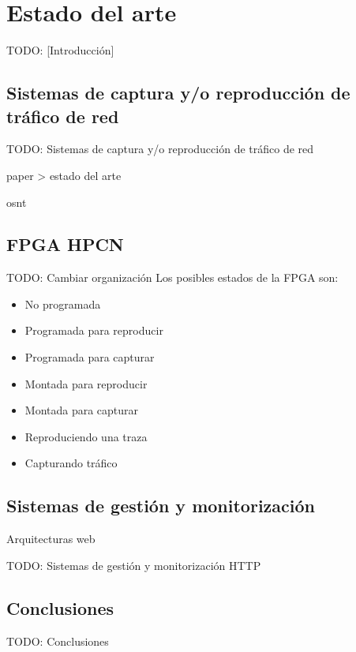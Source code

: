 \chapter{Estado del arte\label{cap:estadoDelArte}}

TODO: [Introducción]


\section{Sistemas de captura y/o reproducción de tráfico de red\label{sec:eda:sistemas_captura_reproducccion}}

TODO: Sistemas de captura y/o reproducción de tráfico de red

paper > estado del arte

osnt

\section{FPGA HPCN\label{ssec:eda:fpga}}
TODO: Cambiar organización
Los posibles estados de la \gls{FPGA} son:
\begin{itemize}\label{fpga:estados}
  \item No programada
  \item Programada para reproducir
  \item Programada para capturar
  \item Montada para reproducir
  \item Montada para capturar
  \item Reproduciendo una \gls{traza}
  \item Capturando tráfico
\end{itemize}

\section{Sistemas de gestión y monitorización\label{sec:eda:sistemas_gestion_monitorizacion}}

Arquitecturas web

TODO: Sistemas de gestión y monitorización
\gls{HTTP}


\section{Conclusiones\label{sec:eda:conclusiones}}

TODO: Conclusiones
